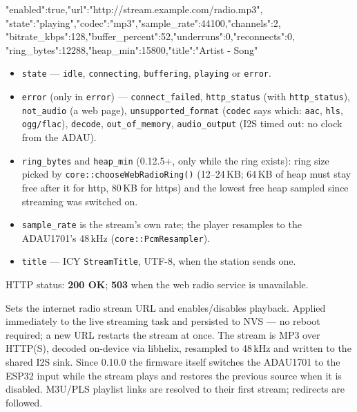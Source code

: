 \begin{drnote}
\begin{drcode}[JSON]
{"enabled":true,"url":"http://stream.example.com/radio.mp3",
 "state":"playing","codec":"mp3","sample_rate":44100,"channels":2,
 "bitrate_kbps":128,"buffer_percent":52,"underruns":0,"reconnects":0,
 "ring_bytes":12288,"heap_min":15800,"title":"Artist - Song"}
\end{drcode}
\begin{itemize}
  \item \texttt{state} --- \texttt{idle}, \texttt{connecting},
        \texttt{buffering}, \texttt{playing} or \texttt{error}.
  \item \texttt{error} (only in \texttt{error}) ---
        \texttt{connect\_failed}, \texttt{http\_status} (with
        \texttt{http\_status}), \texttt{not\_audio} (a web page),
        \texttt{unsupported\_format} (\texttt{codec} says which:
        \texttt{aac}, \texttt{hls}, \texttt{ogg/flac}),
        \texttt{decode}, \texttt{out\_of\_memory},
        \texttt{audio\_output} (I2S timed out: no clock from the ADAU).
  \item \texttt{ring\_bytes} and \texttt{heap\_min} (0.12.5+, only
        while the ring exists): ring size picked by
        \texttt{core::chooseWebRadioRing()} (12--24\,KB; 64\,KB of heap
        must stay free after it for http, 80\,KB for https) and the lowest
        free heap sampled since streaming was switched on.
  \item \texttt{sample\_rate} is the stream's own rate; the player
        resamples to the ADAU1701's 48\,kHz (\texttt{core::PcmResampler}).
  \item \texttt{title} --- ICY \texttt{StreamTitle}, UTF-8, when the
        station sends one.
\end{itemize}
\end{drnote}

HTTP status: \textbf{200 OK}; \textbf{503} when the web radio service is
unavailable.

\label{sec:api-streaming-post}

Sets the internet radio stream URL and enables/disables playback. Applied
immediately to the live streaming task and persisted to NVS --- no reboot
required; a new URL restarts the stream at once. The stream is MP3 over
HTTP(S), decoded on-device via libhelix, resampled to 48\,kHz and written
to the shared I2S sink. Since 0.10.0 the firmware itself switches the
ADAU1701 to the ESP32 input while the stream plays and restores the
previous source when it is disabled. M3U/PLS playlist links are resolved
to their first stream; redirects are followed.

